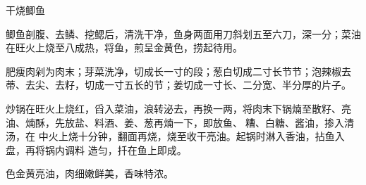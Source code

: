%
%
%
%
%
%
%
\begin{recipe}{干烧鲫鱼}

\ingredients


\preparation

\step 鲫鱼剖腹、去鳞、挖鳃后，清洗干净，鱼身两面用刀斜划五至六刀，深一分；菜油
在旺火上烧至八成热，将鱼，煎呈金黄色，捞起待用。

\step 肥瘦肉剁为肉末；芽菜洗净，切成长一寸的段；葱白切成二寸长节节；泡辣椒去
蒂、去尖、去籽，切成一寸五长的节；姜切成一寸长、二分宽、半分厚的片子。

\step 炒锅在旺火上烧红，舀入菜油，浪转泌去，再换一两，将肉末下锅煵至散籽、亮
油、煵酥，先放盐、料酒、姜、葱再煵一下，即放鱼、𰪿糟、白糖、酱油，掺入清汤，在
中火上烧十分钟，翻面再烧，烧至收干亮油。起锅时淋入香油，拈鱼入盘，再将锅内调料
造匀，扦在鱼上即成。

\features

色金黄亮油，肉细嫩鲜美，香味特浓。

\end{recipe}

